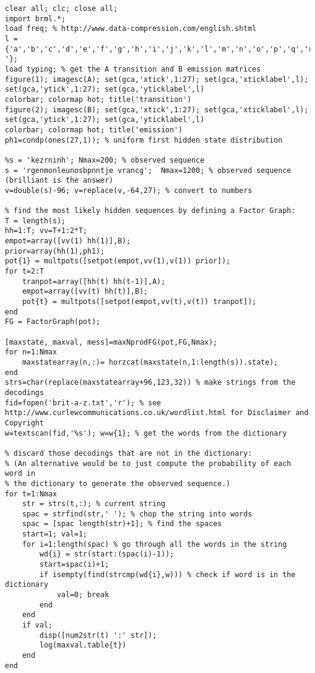 \documentclass[11pt,a4paper,oneside]{report}
\begin{document}
\begin{lstlisting}
clear all; clc; close all;
import brml.*;
load freq; % http://www.data-compression.com/english.shtml
l = {'a','b','c','d','e','f','g','h','i','j','k','l','m','n','o','p','q','r','s','t','u','v','w','x','y','z',' '};
load typing; % get the A transition and B emission matrices
figure(1); imagesc(A); set(gca,'xtick',1:27); set(gca,'xticklabel',l); set(gca,'ytick',1:27); set(gca,'yticklabel',l)
colorbar; colormap hot; title('transition')
figure(2); imagesc(B); set(gca,'xtick',1:27); set(gca,'xticklabel',l); set(gca,'ytick',1:27); set(gca,'yticklabel',l)
colorbar; colormap hot; title('emission')
ph1=condp(ones(27,1)); % uniform first hidden state distribution

%s = 'kezrninh'; Nmax=200; % observed sequence
s = 'rgenmonleunosbpnntje vrancg';  Nmax=1200; % observed sequence (brilliant is the answer)
v=double(s)-96; v=replace(v,-64,27); % convert to numbers

% find the most likely hidden sequences by defining a Factor Graph:
T = length(s);
hh=1:T; vv=T+1:2*T;
empot=array([vv(1) hh(1)],B);
prior=array(hh(1),ph1);
pot{1} = multpots([setpot(empot,vv(1),v(1)) prior]);
for t=2:T
    tranpot=array([hh(t) hh(t-1)],A);
    empot=array([vv(t) hh(t)],B);
    pot{t} = multpots([setpot(empot,vv(t),v(t)) tranpot]);
end
FG = FactorGraph(pot);

[maxstate, maxval, mess]=maxNprodFG(pot,FG,Nmax);
for n=1:Nmax
    maxstatearray(n,:)= horzcat(maxstate(n,1:length(s)).state);
end
strs=char(replace(maxstatearray+96,123,32)) % make strings from the decodings
fid=fopen('brit-a-z.txt','r'); % see http://www.curlewcommunications.co.uk/wordlist.html for Disclaimer and Copyright
w=textscan(fid,'%s'); w=w{1}; % get the words from the dictionary

% discard those decodings that are not in the dictionary:
% (An alternative would be to just compute the probability of each word in
% the dictionary to generate the observed sequence.)
for t=1:Nmax
    str = strs(t,:); % current string
    spac = strfind(str,' '); % chop the string into words
    spac = [spac length(str)+1]; % find the spaces
    start=1; val=1;
    for i=1:length(spac) % go through all the words in the string
        wd{i} = str(start:(spac(i)-1));
        start=spac(i)+1;
        if isempty(find(strcmp(wd{i},w))) % check if word is in the dictionary
            val=0; break
        end
    end
    if val; 
        disp([num2str(t) ':' str]);
        log(maxval.table{t}) 
    end
end
\end{lstlisting}
\end{document}
